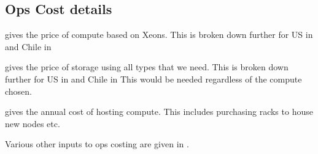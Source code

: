 \subsection{Ops Cost details}\label{sec:opsdetails}
 gives the price of compute based on Xeons.
This is broken down further for US in  and Chile in 

 gives the price of storage using all  types that we need.
This is broken down further for US in  and Chile in 
This would be needed regardless of the compute chosen.







 gives the annual cost of hosting compute. This includes purchasing racks to house
new nodes etc.


Various other inputs to ops costing are given in .

